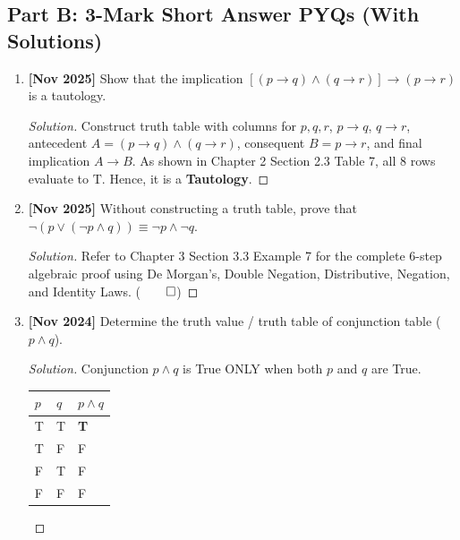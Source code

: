 \documentclass[11pt,a4paper]{article}
\newenvironment{sol}{\begin{proof}[Solution]}{\end{proof}}
\begin{document}
\subsection{Part B: 3-Mark Short Answer PYQs (With Solutions)}

\begin{enumerate}[leftmargin=1.5em, label=\textbf{Q\arabic*:}]
    \item \textbf{[Nov 2025]} Show that the implication $[(p \rightarrow q) \land (q \rightarrow r)] \rightarrow (p \rightarrow r)$ is a tautology.
    \begin{sol}
    Construct truth table with columns for $p, q, r$, $p \rightarrow q$, $q \rightarrow r$, antecedent $A = (p \rightarrow q) \land (q \rightarrow r)$, consequent $B = p \rightarrow r$, and final implication $A \rightarrow B$. As shown in Chapter 2 Section 2.3 Table 7, all 8 rows evaluate to $\text{T}$. Hence, it is a \textbf{Tautology}.
    \end{sol}
    \vspace{6pt}

    \item \textbf{[Nov 2025]} Without constructing a truth table, prove that $\neg(p \lor (\neg p \land q)) \equiv \neg p \land \neg q$.
    \begin{sol}
    Refer to Chapter 3 Section 3.3 Example 7 for the complete 6-step algebraic proof using De Morgan's, Double Negation, Distributive, Negation, and Identity Laws. ($\qed$)
    \end{sol}
    \vspace{6pt}

    \item \textbf{[Nov 2024]} Determine the truth value / truth table of conjunction table ($p \land q$).
    \begin{sol}
    Conjunction $p \land q$ is True ONLY when both $p$ and $q$ are True.
    \begin{table}[htbp]
    \centering
    \small
    \begin{tabularx}{0.5\textwidth}{|*{3}{>{\centering\arraybackslash}X|}}
    \hline
    $p$ & $q$ & $p \land q$ \\ \hline
    T & T & \textbf{T} \\ \hline
    T & F & F \\ \hline
    F & T & F \\ \hline
    F & F & F \\ \hline
    \end{tabularx}
    \end{table}
    \end{sol}
\end{enumerate}
\end{document}
